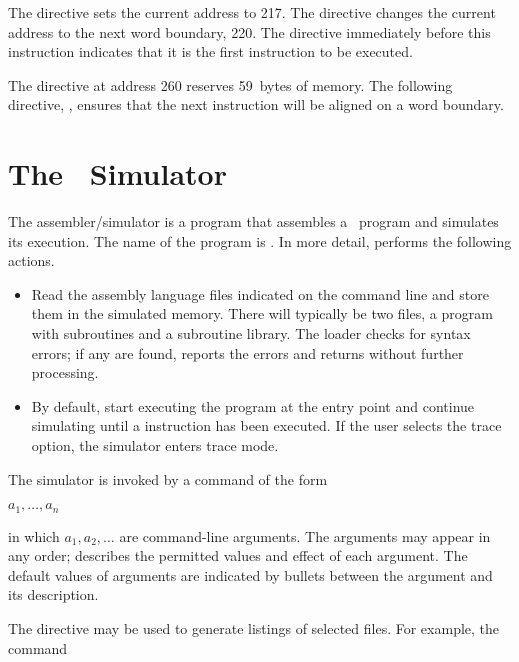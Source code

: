 The directive  sets the current address to 217. The
 directive changes the current address to the next word
boundary, 220. The directive  immediately before this
instruction indicates that it is the first instruction to be executed.

The directive  at address 260 reserves 59~bytes of memory.
The following directive, , ensures that the next instruction
will be aligned on a word boundary.

\section{The \moon\ Simulator}

The assembler/simulator is a program that assembles a \moon\ program and
simulates its execution. The name of the program is . In more
detail,  performs the following actions.

\begin{itemize}

\item Read the assembly language files indicated on the command line and
      store them in the simulated memory. There will typically be two
      files, a program with subroutines and a subroutine library. The
      loader checks for syntax errors; if any are found, 
      reports the errors and returns without further processing.

\item By default, start executing the program at the entry point and
      continue simulating until a  instruction has been
      executed. If the user selects the trace option, the simulator
      enters trace mode.

\end{itemize}

The simulator is invoked by a command of the form

\begin{prog}
 $a_1,\ldots,a_n$
\end{prog}

in which $a_1,a_2,\ldots$ are command-line arguments. The arguments may
appear in any order;  describes the permitted values and effect
of each argument. The default values of arguments are indicated by
bullets between the argument and its description.

The  directive may be used to generate listings of selected files.
For example, the command

